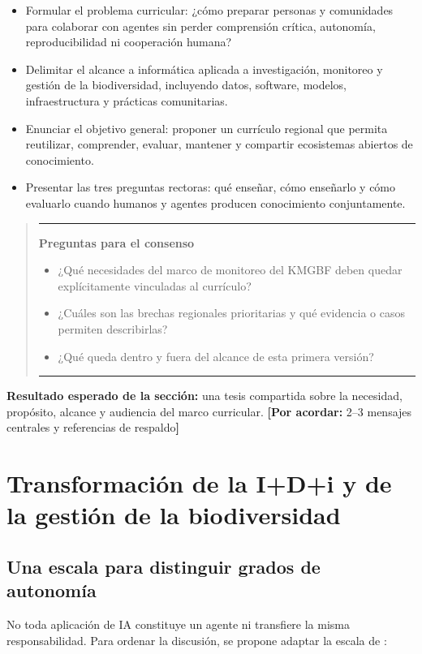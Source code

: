 \documentclass[11pt,a4paper]{article}
\newcommand{\pendiente}[1]{\textcolor{azulieb}{\textbf{[Por acordar:} #1\textbf{]}}}
\newenvironment{preguntas}
  {\par\medskip\begin{quote}\color{azulieb}\hrule\smallskip
   \textbf{Preguntas para el consenso}\par\smallskip\begin{itemize}}
  {\end{itemize}\smallskip\hrule\end{quote}\par\medskip}
\begin{document}
\begin{itemize}
  \item Formular el problema curricular: ¿cómo preparar personas y comunidades
  para colaborar con agentes sin perder comprensión crítica, autonomía,
  reproducibilidad ni cooperación humana?
  \item Delimitar el alcance a informática aplicada a investigación, monitoreo y
  gestión de la biodiversidad, incluyendo datos, software, modelos,
  infraestructura y prácticas comunitarias.
  \item Enunciar el objetivo general: proponer un currículo regional que permita
  reutilizar, comprender, evaluar, mantener y compartir ecosistemas abiertos de
  conocimiento.
  \item Presentar las tres preguntas rectoras: qué enseñar, cómo enseñarlo y cómo
  evaluarlo cuando humanos y agentes producen conocimiento conjuntamente.
\end{itemize}

\begin{preguntas}
  \item ¿Qué necesidades del marco de monitoreo del KMGBF deben quedar
  explícitamente vinculadas al currículo?
  \item ¿Cuáles son las brechas regionales prioritarias y qué evidencia o casos
  permiten describirlas?
  \item ¿Qué queda dentro y fuera del alcance de esta primera versión?
\end{preguntas}

\noindent\textbf{Resultado esperado de la sección:}
una tesis compartida sobre la necesidad, propósito, alcance y audiencia del marco
curricular. \pendiente{2--3 mensajes centrales y referencias de respaldo}

\section{Transformación de la I+D+i y de la gestión de la biodiversidad}

\subsection{Una escala para distinguir grados de autonomía}

No toda aplicación de IA constituye un agente ni transfiere la misma
responsabilidad. Para ordenar la discusión, se propone adaptar la escala de
\citet{wei2025agentic}:
\end{document}

